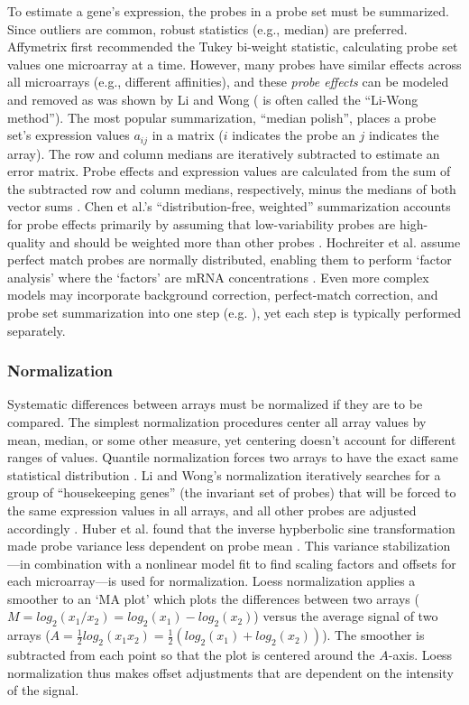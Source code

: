 To estimate a gene's expression, the probes in a probe
set must be summarized. 
Since outliers are common, robust
statistics (e.g., median) are preferred.
Affymetrix first recommended the Tukey bi-weight
statistic, calculating probe set values one microarray at a time.
However, many probes have similar effects across all microarrays
(e.g., different affinities), and these \textit{probe effects} can 
be modeled and removed as was shown by Li and Wong 
(\cite{Li:2001jv,Li:2001wk} is often called the ``Li-Wong method'').
The most popular summarization, ``median polish'', places a probe set's expression
values $a_{ij}$ in a matrix ($i$ indicates the probe an $j$ 
indicates the array). The row and column medians are 
iteratively subtracted to estimate an error matrix. Probe effects and
expression values are calculated from the sum of the subtracted row 
and column medians, respectively, minus the 
medians of both vector sums \cite{Mosteller:1977vp,Irizarry:2003ge}.  
Chen et al.'s ``distribution-free, weighted'' summarization
accounts for probe effects primarily by assuming that low-variability
probes are high-quality and should be weighted more 
than other probes \cite{Chen:2007cr}.
Hochreiter et al. assume perfect match probes are normally distributed, enabling
them to perform `factor analysis' 
where the `factors'
are mRNA concentrations \cite{Hochreiter:2006ja}. 
Even more complex models may incorporate 
background correction, perfect-match correction, and probe set summarization
into one step (e.g. \cite{Zhang:2003to,Liu:2005ey}), 
yet each step is typically performed separately.

\subsubsection{Normalization}

Systematic differences between arrays must be normalized if they
are to be compared. The simplest normalization procedures center
all array values by mean, median, or some other measure, yet centering
doesn't account for different ranges of values.
Quantile normalization forces two arrays to have the exact same
statistical distribution \cite{Bolstad:2003ia}. Li and Wong's normalization
iteratively searches for a group of ``housekeeping genes'' (the invariant 
set of probes) that will be forced to the same expression values in all arrays,
and all other probes are adjusted accordingly \cite{Li:2001wk}.
Huber et al. found that the inverse hypberbolic sine transformation
made probe variance less dependent on probe mean \cite{Huber:2003bw}.
This variance stabilization---in combination with a nonlinear model fit to find
scaling factors and offsets for each microarray---is used for normalization.
Loess normalization applies a smoother to an `MA plot' which plots
the differences between two arrays ($M=log_2(x_1/x_2)=log_2(x_1)-log_2(x_2)$)
versus the average signal of two arrays ($A=\frac{1}{2}log_2(x_1x_2)=\frac{1}{2}(log_2(x_1)+log_2(x_2))$).
The smoother is subtracted from each point so that the plot
is centered around the $A$-axis. Loess normalization thus makes
offset adjustments that are dependent on the intensity of the signal.


